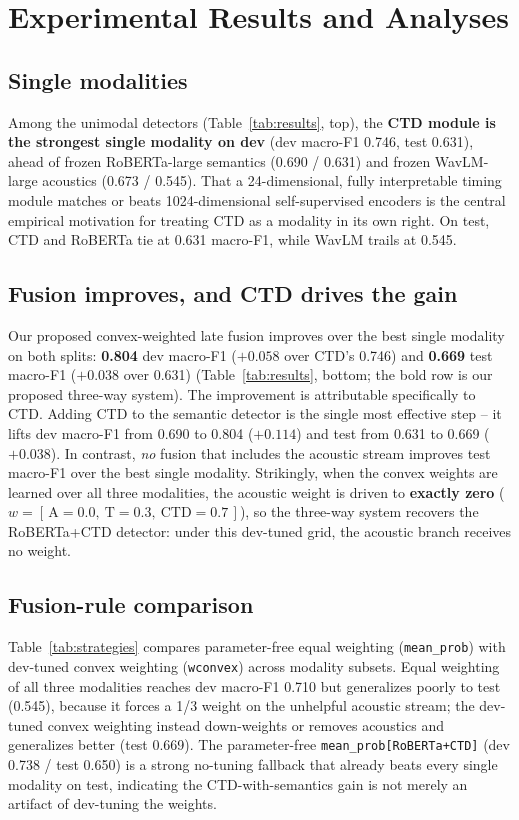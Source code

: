 \documentclass{article}
\begin{document}
\section{Experimental Results and Analyses}
\label{sec:results}

\subsection{Single modalities} 
Among the unimodal detectors (Table~\ref{tab:results}, top), the \textbf{CTD module is the strongest single modality on dev} (dev macro-F1 0.746, test 0.631), ahead of frozen RoBERTa-large semantics (0.690 / 0.631) and frozen WavLM-large acoustics (0.673 / 0.545). That a 24-dimensional, fully interpretable timing module matches or beats 1024-dimensional self-supervised encoders is the central empirical motivation for treating CTD as a modality in its own right. On test, CTD and RoBERTa tie at 0.631 macro-F1, while WavLM trails at 0.545.

\subsection{Fusion improves, and CTD drives the gain} 
Our proposed convex-weighted late fusion improves over the best single modality on both splits: \textbf{0.804} dev macro-F1 ($+0.058$ over CTD's 0.746) and \textbf{0.669} test macro-F1 ($+0.038$ over 0.631) (Table~\ref{tab:results}, bottom; the bold row is our proposed three-way system). The improvement is attributable specifically to CTD. Adding CTD to the semantic detector is the single most effective step -- it lifts dev macro-F1 from 0.690 to 0.804 ($+0.114$) and test from 0.631 to 0.669 ($+0.038$). In contrast, \emph{no} fusion that includes the acoustic stream improves test macro-F1 over the best single modality. Strikingly, when the convex weights are learned over all three modalities, the acoustic weight is driven to \textbf{exactly zero} ($w = [\,\text{A}{=}0.0,\ \text{T}{=}0.3,\ \text{CTD}{=}0.7\,]$), so the three-way system recovers the RoBERTa+CTD detector: under this dev-tuned grid, the acoustic branch receives no weight.

\subsection{Fusion-rule comparison} 
Table~\ref{tab:strategies} compares parameter-free equal weighting (\texttt{mean\_prob}) with dev-tuned convex weighting (\texttt{wconvex}) across modality subsets. Equal weighting of all three modalities reaches dev macro-F1 0.710 but generalizes poorly to test (0.545), because it forces a 1/3 weight on the unhelpful acoustic stream; the dev-tuned convex weighting instead down-weights or removes acoustics and generalizes better (test 0.669). The parameter-free \texttt{mean\_prob[RoBERTa+CTD]} (dev 0.738 / test 0.650) is a strong no-tuning fallback that already beats every single modality on test, indicating the CTD-with-semantics gain is not merely an artifact of dev-tuning the weights.
\end{document}
